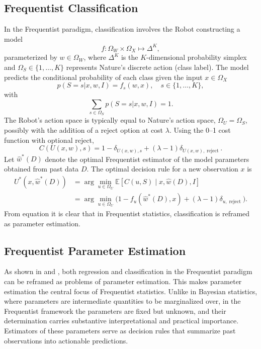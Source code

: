 \subsection{Frequentist Classification}
\label{chp:frequentist_classification}
In the Frequentist paradigm, classification involves the Robot constructing a model
\begin{equation}
	f: \Omega_W \times \Omega_X \mapsto \Delta^K,
\end{equation}
parameterized by $w \in \Omega_W$, where $\Delta^K$ is the $K$-dimensional probability simplex and $\Omega_S \in \{1,\dots,K\}$ represents Nature's discrete action (class label). The model predicts the conditional probability of each class given the input $x \in \Omega_X$
\begin{equation}
	p(S = s | x, w, I) = f_s(w, x), \quad s \in \{1,\dots,K\},
\end{equation}
with
\begin{equation}
	\sum_{s\in \Omega_S} p(S = s | x, w, I) = 1.
\end{equation}
The Robot's action space is typically equal to Nature's action space, $\Omega_U = \Omega_S$, possibly with the addition of a reject option at cost $\lambda$. Using the 0--1 cost function with optional reject,
\begin{equation}
	C(U(x,w), s) = 1 - \delta_{U(x,w),s} + (\lambda-1)\delta_{U(x,w), \operatorname{reject}}.
\end{equation}
Let $\hat{w}^*(D)$ denote the optimal Frequentist estimator of the model parameters obtained from past data $D$. The optimal decision rule for a new observation $x$ is
\begin{equation}
	\begin{split}
		U^*(x, \hat{w}^*(D)) &= \arg\min_{u \in \Omega_U} \mathbb{E}[C(u, S) \mid x, \hat{w}(D), I] \\
		&= \arg\min_{u \in \Omega_U} \Big(1 - f_{u}(\hat{w}^*(D), x) + (\lambda-1)\delta_{u, \operatorname{reject}}\Big).
	\end{split}
	\label{freq:decision_classification}
\end{equation}
From equation  it is clear that in Frequentist statistics, classification is reframed as parameter estimation.


\subsection{Frequentist Parameter Estimation}
\label{chp:frequentist_parameter_estimation}
As shown in  and , both regression and classification in the Frequentist paradigm can be reframed as problems of parameter estimation. This makes parameter estimation the central focus of Frequentist statistics. Unlike in Bayesian statistics, where parameters are intermediate quantities to be marginalized over, in the Frequentist framework the parameters are fixed but unknown, and their determination carries substantive interpretational and practical importance. Estimators of these parameters serve as decision rules that summarize past observations into actionable predictions.


